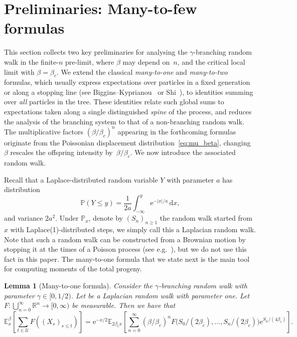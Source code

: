 \documentclass[a4paper, a4wide, 10pt, reqno]{amsart}
\theoremstyle{plain}
\newtheorem{lemma}[theorem]{Lemma}
\theoremstyle{definition}
\numberwithin{equation}{section}
\newcommand{\R}{{\mathbb R}}
\newcommand{\E}{\mathbb E}
\newcommand{\Prob}{\mathbb{P}}
\newcommand{\sU}{{\mathscr U}}
\newcommand{\re}{{\mathrm e}}
\newcommand{\rd}{\mathrm{d}}
\begin{document}
\section{Preliminaries: Many-to-few formulas} \label{sec:many-to-few}
This section collects two key preliminaries for analysing  the $\gamma$-branching random walk in the finite-$n$ pre-limit, where $\beta$ may depend on~$n$, and the critical local limit with $\beta=\beta_c$.  
We extend the classical \emph{many-to-one} and \emph{many-to-two} formulas, which usually express expectations over particles in a fixed generation or along a stopping line (see Biggins--Kyprianou~\cite{Biggins2004} or Shi~\cite{ShiLectureNotes}), to identities summing over \emph{all} particles in the tree.  These identities relate such global sums to expectations taken along a single distinguished \emph{spine} of the process, and reduces the analysis of the branching system to that of a non-branching random walk.  
The multiplicative factors $(\beta/\beta_c)^n$  appearing in the forthcoming formulas originate from the Poissonian displacement distribution~\eqref{eq:mu_beta}, changing $\beta$ rescales the offspring intensity by~$\beta/\beta_c$. We now introduce the associated random walk.

\smallskip 
Recall that a Laplace-distributed random variable $Y$ with parameter $a$ has distribution 
\[
\Prob(Y\le y) = \frac{1}{2a}\int_{-\infty}^y\re^{-|x|/a}\, \rd x,
\]
and variance  $2a^2$.
Under $\Prob_x$, denote by $(S_n)_{n\ge 1}$ the random walk started from $x$ with Laplace(1)-distributed steps, we simply call this a Laplacian random walk. Note that such a random walk can be constructed from a Brownian motion by stopping it at the times of a Poisson process (see e.g.~\cite[Formula 1.1.0.5]{HandbookBM}), but we do not use this fact in this paper.
%
The many-to-one formula that we state next is the main tool for computing moments of the total progeny.
\begin{lemma}[Many-to-one formula]\label{lem:many-to-one} Consider the $\gamma$-branching random walk with parameter $\gamma\in[0, 1/2)$. Let  be a Laplacian random walk with parameter one. Let $F\colon\bigcup_{n=0}^\infty {\R}^n\to [0,\infty)$ be measurable.
Then we have that
	\begin{equation}\label{eq:many-to-one}
		\E_x^\beta\left[\sum_{t\in \sU} F((X_s)_{s\le t})\right] = \re^{- x/2}\E_{ 2\beta_c x}\left[\sum_{n=0}^\infty (\beta/\beta_c)^nF\big(S_0/(2\beta_c),\ldots,S_n/(2\beta_c)\big)\re^{ S_n/(4\beta_c)}\right].
	\end{equation}
\end{lemma}
\end{document}
